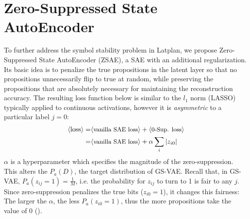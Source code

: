 \section{Zero-Suppressed State AutoEncoder}
\label{zsae}


To further address the symbol stability problem in Latplan,
we propose Zero-Suppressed State AutoEncoder (ZSAE),
a SAE with an additional regularization.
% 
Its basic idea is to penalize the
true propositions in the latent layer so that no propositions unnecessarily flip to true at random,
while preserving the propositions that are absolutely necessary for maintaining the reconstruction accuracy.
% 
The resulting loss function below is similar to the $l_1$ norm (LASSO) typically
applied to continuous activations, however it is \emph{asymmetric} to a particular label $j=0$:
\begin{align*}
 \brackets{\text{loss}} = & \brackets{\text{\small vanilla SAE loss}} + \brackets{\text{\small 0-Sup. loss}} \\ 
 =                        & \brackets{\text{\small vanilla SAE loss}} + \alpha \sum_i |z_{i0}|
\end{align*}
$\alpha$ is a hyperparameter which specifies the magnitude of the zero-suppression.
% 
This alters the $P_a(D)$, the target distribution of GS-VAE.
Recall that, in GS-VAE, $P_a(z_{ij}=1)=\frac{1}{M}$, i.e. the probability for $z_{ij}$ to turn to 1 is fair to any $j$.
Since zero-suppression penalizes the true bits ($z_{i0}=1$), it changes this fairness: The larger the $\alpha$,
the less $P_a(z_{i0}=1)$,
thus the more propositions take the value of 0 ().

